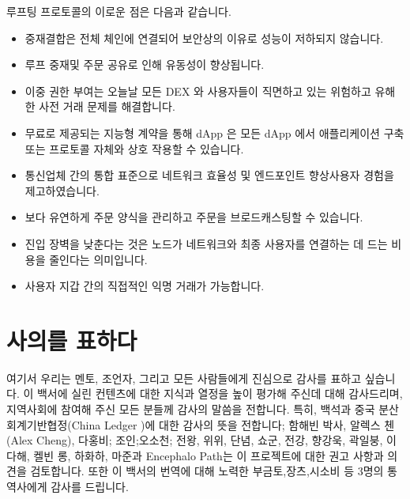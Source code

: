 \documentclass{article}
\begin{document}
\begin{multicols}{2}
\indent 루프팅 프로토콜의 이로운 점은 다음과 같습니다.

\begin{itemize}
      \item 중재결합은  전체 체인에 연결되어 보안상의 이유로 성능이 저하되지 않습니다.
      \item 루프 중재및 주문 공유로 인해 유동성이 향상됩니다.
      \item 이중 권한 부여는 오늘날 모든 DEX 와 사용자들이 직면하고 있는 위험하고 유해한 사전 거래 문제를 해결합니다.
      \item 무료로 제공되는 지능형 계약을 통해 dApp 은 모든 dApp 에서 애플리케이션 구축 또는 프로토콜 자체와 상호 작용할 수 있습니다.
      \item 통신업체 간의 통합 표준으로 네트워크 효율성 및 엔드포인트 향상사용자 경험을 제고하였습니다.
      \item 보다 유연하게 주문 양식을 관리하고 주문을 브로드캐스팅할 수 있습니다.
      \item 진입 장벽을 낮춘다는 것은 노드가 네트워크와 최종 사용자를 연결하는 데 드는 비용을 줄인다는 의미입니다.
      \item 사용자 지갑 간의 직접적인 익명 거래가 가능합니다.
\end{itemize}

\section{사의를 표하다}
\indent 여기서 우리는 멘토, 조언자, 그리고 모든 사람들에게 진심으로 감사를 표하고 싶습니다. 이 백서에 실린 컨텐츠에 대한 지식과 열정을 높이 평가해 주신데 대해 감사드리며, 지역사회에 참여해 주신 모든 분들께 감사의 말씀을 전합니다. 특히, 백석과 중국 분산 회계기반협정(China Ledger )에 대한 감사의 뜻을 전합니다; 함해빈 박사, 알렉스 첸(Alex Cheng), 다홍비; 조인;오소천; 전왕, 위위, 단념, 쇼군, 전강, 향강욱, 곽일붕, 이다해, 켈빈 롱, 하화하, 마준과 Encephalo Path는 이 프로젝트에 대한 권고 사항과 의견을 검토합니다. 또한 이 백서의  번역에 대해 노력한 부금토,장츠,시소비 등 3명의 통역사에게 감사를 드립니다.






\end{multicols}
\end{document}
